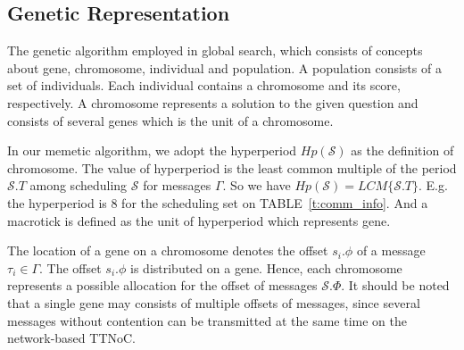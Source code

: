 \documentclass[journal]{IEEEtran}
\newcommand{\calS}{\mathcal{S}}
\theoremstyle{remark}
\begin{document}
\subsection{Genetic Representation}

The genetic algorithm employed in global search, which consists of concepts about gene, chromosome,
 individual and population. 
A population consists of a set of individuals. 
Each individual contains a chromosome and its score, respectively.
A chromosome represents a solution to the given question and consists of several genes which is the unit of a chromosome.

In our memetic algorithm,
 we adopt the hyperperiod $Hp(\calS)$ as the definition of chromosome.
The value of hyperperiod is the least common multiple of the period $\calS.T$ among scheduling $\calS$ for messages $\Gamma$.
So we have $Hp(\calS) = LCM\{\calS.T\}$.
E.g. the hyperperiod is 8 for the scheduling set on TABLE~\ref{t:comm_info}. 
And a macrotick is defined as the unit of hyperperiod which represents gene.


The location of a gene on a chromosome denotes the offset $ s_i.\phi $ of a message $\tau_i\in\Gamma$.
The offset $s_i.\phi$ is distributed on a gene.
Hence, each chromosome represents a possible allocation for the offset of messages $\calS.\Phi$.
It should be noted that a single gene may consists of multiple offsets of messages,
 since several messages without contention can be transmitted at the same time on the network-based TTNoC.
\end{document}
